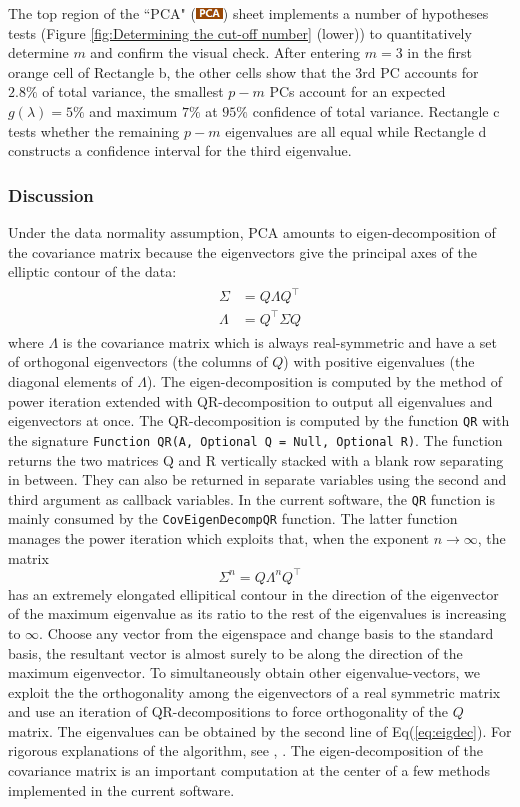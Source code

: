 \documentclass[article]{jss}
\numberwithin{equation}{subsection}
\newcommand{\shtPCA}{``PCA" (\includegraphics[height=8pt, keepaspectratio=true]{img/PcaSheetTab_png}) }
\begin{document}
        The top region of the \shtPCA sheet implements a number of hypotheses tests (Figure \ref{fig:Determining the cut-off number} (lower)) to quantitatively determine $m$ and confirm the visual check.         
        After entering $m=3$ in the first orange cell of Rectangle b, the other cells show that the 3rd PC accounts for $2.8\%$ of total variance, the smallest $p-m$ PCs account for an expected $g(\lambda)=5\%$ and maximum $7\%$ at $95\%$ confidence of total variance. Rectangle c tests whether the remaining $p-m$ eigenvalues are all equal while Rectangle d constructs a confidence interval for the third eigenvalue.
        
        \subsubsection{Discussion}Under the data normality assumption, PCA amounts to eigen-decomposition of the covariance matrix because the eigenvectors give the principal axes of the elliptic contour of the data: 
        \begin{align}\label{eq:eigdec}
        \begin{split}
        \Sigma &= Q\Lambda Q^\intercal \\
        \Lambda &= Q^\intercal \Sigma Q 
        \end{split}
        \end{align}
        where $\Lambda$ is the covariance matrix which is always real-symmetric and have a set of orthogonal eigenvectors (the columns of $Q$) with positive eigenvalues (the diagonal elements of $\Lambda$). The eigen-decomposition is computed by the method of power iteration extended with QR-decomposition to output all eigenvalues and eigenvectors at once. The QR-decomposition is computed by the  function \texttt{QR} with the signature \texttt{Function QR(A, Optional Q = Null, Optional R)}. The function returns the two matrices Q and R vertically stacked with a blank row separating in between. They can also be returned in separate variables using the second and third argument as callback variables. In the current software, the \texttt{QR} function is mainly consumed by the \texttt{CovEigenDecompQR} function. The latter function manages the power iteration which exploits that, when the exponent $n\rightarrow\infty$, the matrix $$\Sigma^n=Q\Lambda^nQ^\intercal$$ has an extremely elongated ellipitical contour in the direction of the eigenvector of the maximum eigenvalue as its ratio to the rest of the eigenvalues is increasing to $\infty$.  Choose any vector from the eigenspace and change basis to the standard basis, the resultant vector is almost surely to be along the direction of the maximum eigenvector. To simultaneously obtain other eigenvalue-vectors, we exploit the the orthogonality among the eigenvectors of a real symmetric matrix and use an iteration of QR-decompositions to force orthogonality of the $Q$ matrix. The eigenvalues can be obtained by the second line of Eq(\ref{eq:eigdec}). For rigorous explanations of the algorithm, see \cite{GolubVanLoan2012MatrixComputations4e}, \cite{SauerT2011NumericalAnalysis2e}. The eigen-decomposition of the covariance matrix is an important computation at the center of a few methods implemented in the current software.
        
\end{document}
